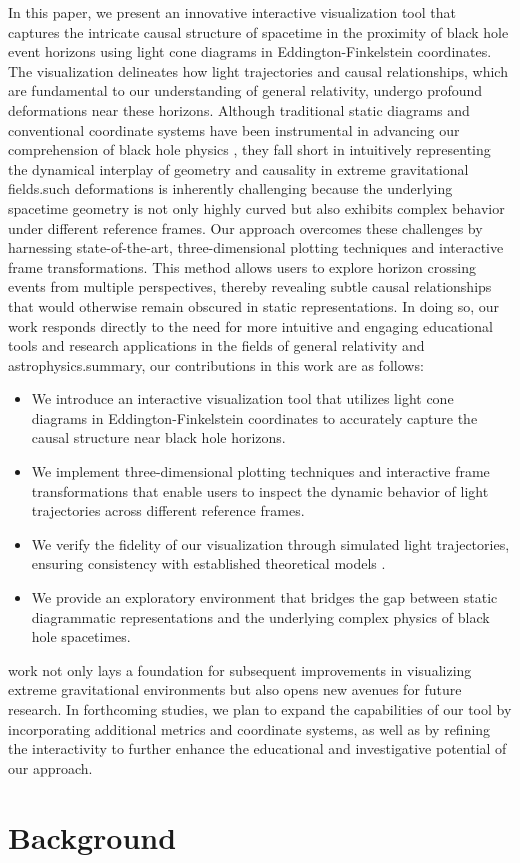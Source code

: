 \documentclass{article}
\begin{document}
In this paper, we present an innovative interactive visualization tool that captures the intricate causal structure of spacetime in the proximity of black hole event horizons using light cone diagrams in Eddington-Finkelstein coordinates. The visualization delineates how light trajectories and causal relationships, which are fundamental to our understanding of general relativity, undergo profound deformations near these horizons. Although traditional static diagrams and conventional coordinate systems have been instrumental in advancing our comprehension of black hole physics \cite{ref1}, they fall short in intuitively representing the dynamical interplay of geometry and causality in extreme gravitational fields.\n\nVisualizing such deformations is inherently challenging because the underlying spacetime geometry is not only highly curved but also exhibits complex behavior under different reference frames. Our approach overcomes these challenges by harnessing state-of-the-art, three-dimensional plotting techniques and interactive frame transformations. This method allows users to explore horizon crossing events from multiple perspectives, thereby revealing subtle causal relationships that would otherwise remain obscured in static representations. In doing so, our work responds directly to the need for more intuitive and engaging educational tools and research applications in the fields of general relativity and astrophysics.\n\nIn summary, our contributions in this work are as follows:\n\begin{itemize}\n  \item We introduce an interactive visualization tool that utilizes light cone diagrams in Eddington-Finkelstein coordinates to accurately capture the causal structure near black hole horizons.\n  \item We implement three-dimensional plotting techniques and interactive frame transformations that enable users to inspect the dynamic behavior of light trajectories across different reference frames.\n  \item We verify the fidelity of our visualization through simulated light trajectories, ensuring consistency with established theoretical models \cite{ref2}.\n  \item We provide an exploratory environment that bridges the gap between static diagrammatic representations and the underlying complex physics of black hole spacetimes.\n\end{itemize}\n\nThis work not only lays a foundation for subsequent improvements in visualizing extreme gravitational environments but also opens new avenues for future research. In forthcoming studies, we plan to expand the capabilities of our tool by incorporating additional metrics and coordinate systems, as well as by refining the interactivity to further enhance the educational and investigative potential of our approach.\section{Background}
\end{document}

